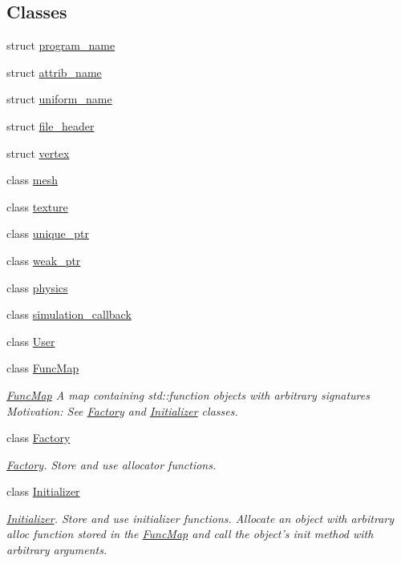 \subsection*{Classes}
\begin{DoxyCompactItemize}
\item 
struct \hyperlink{structNeb_1_1program__name}{program\-\_\-name}
\item 
struct \hyperlink{structNeb_1_1attrib__name}{attrib\-\_\-name}
\item 
struct \hyperlink{structNeb_1_1uniform__name}{uniform\-\_\-name}
\item 
struct \hyperlink{structNeb_1_1file__header}{file\-\_\-header}
\item 
struct \hyperlink{structNeb_1_1vertex}{vertex}
\item 
class \hyperlink{classNeb_1_1mesh}{mesh}
\item 
class \hyperlink{classNeb_1_1texture}{texture}
\item 
class \hyperlink{classNeb_1_1unique__ptr}{unique\-\_\-ptr}
\item 
class \hyperlink{classNeb_1_1weak__ptr}{weak\-\_\-ptr}
\item 
class \hyperlink{classNeb_1_1physics}{physics}
\item 
class \hyperlink{classNeb_1_1simulation__callback}{simulation\-\_\-callback}
\item 
class \hyperlink{classNeb_1_1User}{User}
\item 
class \hyperlink{classNeb_1_1FuncMap}{Func\-Map}
\begin{DoxyCompactList}\small\item\em \hyperlink{classNeb_1_1FuncMap}{Func\-Map} A map containing {\ttfamily std\-::function} objects with arbitrary signatures Motivation\-: See \hyperlink{classNeb_1_1Factory}{Factory} and \hyperlink{classNeb_1_1Initializer}{Initializer} classes. \end{DoxyCompactList}\item 
class \hyperlink{classNeb_1_1Factory}{Factory}
\begin{DoxyCompactList}\small\item\em \hyperlink{classNeb_1_1Factory}{Factory}. Store and use allocator functions. \end{DoxyCompactList}\item 
class \hyperlink{classNeb_1_1Initializer}{Initializer}
\begin{DoxyCompactList}\small\item\em \hyperlink{classNeb_1_1Initializer}{Initializer}. Store and use initializer functions. Allocate an object with arbitrary alloc function stored in the \hyperlink{classNeb_1_1FuncMap}{Func\-Map} and call the object's {\ttfamily init} method with arbitrary arguments. \end{DoxyCompactList}\item 

\end{DoxyCompactItemize}
